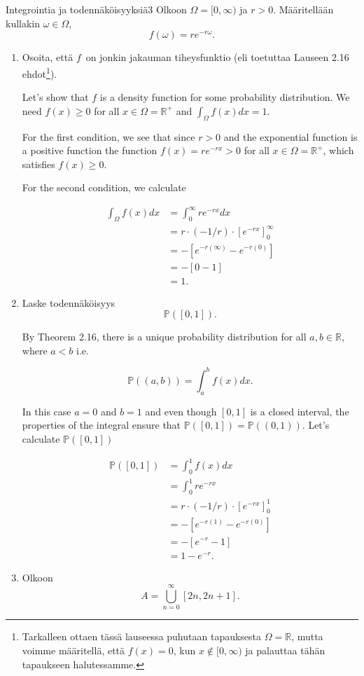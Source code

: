 \documentclass[11pt,a4paper]{amsart}
\newcommand{\R}{\mathbb{R}}
\newcommand{\1}{\mathbf{1}}
\renewcommand{\P}{\mathbb P}
\begin{document}
\begin{Exercises}{Integrointia ja todennäköisyyksiä}{3}
Olkoon $\Omega=[0,\infty)$ ja $r>0$. Määritellään kullakin $\omega\in \Omega$, 
\[
f(\omega)=re^{-r\omega}.
\]
\begin{enumerate}
\item Osoita, että $f$ on jonkin jakauman tiheysfunktio (eli toetuttaa Lauseen 2.16 ehdot\footnote{Tarkalleen ottaen tässä lauseessa puhutaan tapauksesta $\Omega=\R$‚ mutta voimme määritellä, että $f(x)=0$, kun $x\notin [0,\infty)$ ja palauttaa tähän tapaukseen halutessamme.}).

    Let's show that $ f$ is a density function for some probability distribution. We need $ f(x)
    \geq 0$ for all $ x \in \Omega = \R^{+} $ and $ \int_{\Omega} f(x) dx = 1$. 

    For the first condition, we see that since $ r > 0$ and the exponential function is a positive
    function the function $ f(x) = r e^{-rx} > 0$ for all $ x \in \Omega = \R^{+}$, which
    satisfies $ f(x) \geq 0$. 

    For the second condition, we calculate

    \begin{align*}
	\int_{\Omega} f(x) dx &= \int_{0}^{\infty} r e^{-rx} dx\\
			      &= r \cdot (-1/r) \cdot \left[e^{-rx}  \right]_{0}^{\infty} \\
			      &= - \left[ e^{-r(\infty)} - e^{-r(0)}  \right] \\
			      &= - [0-1] \\
			      &= 1.
    \end{align*}
\item Laske todennäköisyys
\[
\P([0,1]).
\]

    By Theorem 2.16, there is a unique probability distribution for all $ a,b \in \R$, where $ a <
    b$ i.e.

    \[
	\P((a,b)) = \int_{a}^{b} f(x) dx  
    .\]

    In this case $ a = 0$ and $ b=1$ and even though $ [0,1]$ is a closed interval, the properties
    of the integral ensure that $ \P([0,1]) = \P((0,1))$. Let's calculate $ \P([0,1])$ 

    \begin{align*}
	\P([0,1]) &= \int_{0}^{1} f(x) dx \\
		  &= \int_{0}^{1} r e^{-rx} \\
		  &= r \cdot (-1/r) \cdot \left[  e^{-rx}\right]_{0}^{1} \\
		  &= - \left[ e^{-r(1)} - e^{-r(0)}  \right] \\
		  &= - \left[ e^{-r} -1 \right] \\
		  &= 1 - e^{-r}. 
    \end{align*}
\item Olkoon 
\[
A=\bigcup_{n=0}^\infty [2n,2n+1].
\]


\end{enumerate}
\end{Exercises}
\end{document}
